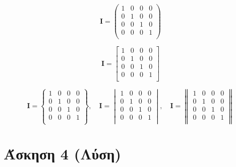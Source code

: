 \documentclass[a4paper,11pt]{article}
\begin{document}
	\quad
	
	\begin{equation}
	\textbf{I} = 
	\begin{pmatrix}
	1&0&0&0 \\
	0&1&0&0 \\
	0&0&1&0 \\
	0&0&0&1 \\
	\end{pmatrix}
	\end{equation}
	
	\quad
	
	\begin{equation}
	\textbf{I} = 
	\begin{bmatrix}
	1&0&0&0 \\
	0&1&0&0 \\
	0&0&1&0 \\
	0&0&0&1 \\
	\end{bmatrix}
	\end{equation}
	
	\quad
	
	\begin{equation}
	\textbf{I} =
	\begin{Bmatrix} 
	1&0&0&0 \\
	0&1&0&0 \\
	0&0&1&0 \\
	0&0&0&1 \\
	\end{Bmatrix},\quad
	\textbf{I} =
	\begin{vmatrix} 
	1&0&0&0 \\
	0&1&0&0 \\
	0&0&1&0 \\
	0&0&0&1 \\
	\end{vmatrix},\quad
	\textbf{I} =
	\begin{Vmatrix} 
	1&0&0&0 \\
	0&1&0&0 \\
	0&0&1&0 \\
	0&0&0&1 \\
	\end{Vmatrix}
	\end{equation}

\vspace{20pt}

\section{Άσκηση 4 (Λύση)}
		
\end{document}
